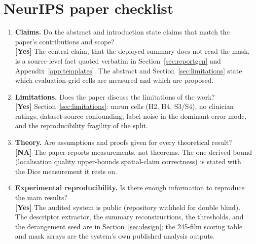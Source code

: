 
\providecommand{\answerYes}[1][]{\textbf{[Yes]} #1}
\providecommand{\answerNo}[1][]{\textbf{[No]} #1}
\providecommand{\answerNA}[1][]{\textbf{[NA]} #1}
\providecommand{\answerTODO}[1][]{\textbf{[TODO]} #1}

\section*{NeurIPS paper checklist}

\begin{enumerate}

\item \textbf{Claims.} Do the abstract and introduction state claims that match the paper's contributions and scope?\\
\answerYes{The central claim, that the deployed summary does not read the mask, is a source-level fact quoted verbatim in Section~\ref{sec:reportgen} and Appendix~\ref{app:templates}. The abstract and Section~\ref{sec:limitations} state which evaluation-grid cells are measured and which are proposed.}

\item \textbf{Limitations.} Does the paper discuss the limitations of the work?\\
\answerYes{Section~\ref{sec:limitations}: unrun cells (H2, H4, S3/S4), no clinician ratings, dataset-source confounding, label noise in the dominant error mode, and the reproducibility fragility of the split.}

\item \textbf{Theory.} Are assumptions and proofs given for every theoretical result?\\
\answerNA{The paper reports measurements, not theorems. The one derived bound (localisation quality upper-bounds spatial-claim correctness) is stated with the Dice measurement it rests on.}

\item \textbf{Experimental reproducibility.} Is there enough information to reproduce the main results?\\
\answerYes{The audited system is public (repository withheld for double blind). The descriptor extractor, the summary reconstructions, the thresholds, and the derangement seed are in Section~\ref{sec:design}; the 245-film scoring table and mask arrays are the system's own published analysis outputs.}


\end{enumerate}
